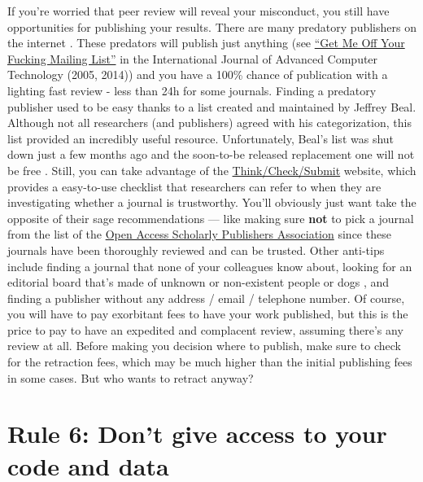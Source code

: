 \documentclass[a4paper,10pt,onecolumn]{article}
\begin{document}
If you're worried that peer review will reveal your misconduct, you still have opportunities for publishing your results. There are many predatory publishers on
the internet \citep{shen:2015}. These predators will
publish just anything
(see \href{https://en.wikipedia.org/wiki/International_Journal_of_Advanced_Computer_Technology#Publication_controversy}{``Get
  Me Off Your Fucking Mailing List''} in the International Journal of Advanced
Computer Technology (2005, 2014)) and you have a 100\% chance of publication with a lighting fast review - less than 24h for some
journals. Finding a predatory publisher used to be easy thanks to a list
created and maintained by Jeffrey Beal. Although not all researchers (and publishers)
agreed with his categorization, this list provided an incredibly useful resource. Unfortunately, Beal's list was shut down just a few months ago
\citep{straumsheim:2017} and the
soon-to-be released replacement one will not be free \citep{silver:2017}. Still,
you can take advantage of the
\href{http://thinkchecksubmit.org}{Think/Check/Submit} website, which provides a
easy-to-use checklist that researchers can refer to when they are investigating
whether a journal is trustworthy. You'll obviously just want take the opposite of their sage recommendations --- like making sure \textbf{not} to pick a journal from the list of the 
\href{https://oaspa.org}{Open Access Scholarly Publishers Association} since
these journals have been thoroughly reviewed and can be trusted. Other anti-tips include finding a journal that none of your colleagues know about, looking for an editorial board that's made of
unknown or non-existent people \citep{sorokowski:2017} or dogs \citep{kennedy:2017}, and finding a publisher without any address / email / telephone number. Of course, you
will have to pay exorbitant fees to have your work published, but this is the
price to pay to have an expedited and complacent review, assuming there's any review at
all. Before making you decision where to publish, make sure to check
for the retraction fees, which may be much higher than the initial publishing
fees in some cases. But who wants to retract anyway?

\section*{Rule 6: Don't give access to your code and data}
\end{document}
